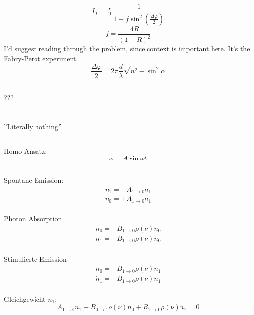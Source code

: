 \documentclass[12pt]{report}
\newcommand{\vphi}{\varphi}
\begin{document}
\[I_T=I_0\frac{1}{1+f\sin^2\left(\frac{\Delta\vphi}{2}\right)}\]
\[f=\frac{4R}{(1-R)^2}\]
I'd suggest reading through the problem, since context is important here. It's the Fabry-Perot experiment.
\[\frac{\Delta\vphi}{2}=2\pi\frac{d}{\lambda}\sqrt{n^2-\sin^2\alpha}\]

\subsection{}
???

\section{}

\section{}

\section{}

\subsection{}
''Literally nothing''

\subsection{}
Homo Ansatz: \[x=A\sin\omega t\]

\subsection{}
Spontane Emission: \begin{align*}\dot{n}_1=-A_{1\to0}n_1\\\dot{n}_0=+A_{1\to0}n_1\end{align*}\\
Photon Absorption\begin{align*}\dot{n}_0=-B_{1\to0}\rho(\nu)n_0\\\dot{n}_1=+B_{1\to0}\rho(\nu)n_0\end{align*}\\
Stimulierte Emission\begin{align*}\dot{n}_0=+B_{1\to0}\rho(\nu)n_1\\\dot{n}_1=-B_{1\to0}\rho(\nu)n_1\end{align*}\\
Gleichgewicht $n_1$:
\[A_{1\to0}n_1-B_{0\to1}\rho(\nu)n_0+B_{1\to0}\rho(\nu)n_1=0\]
\end{document}
